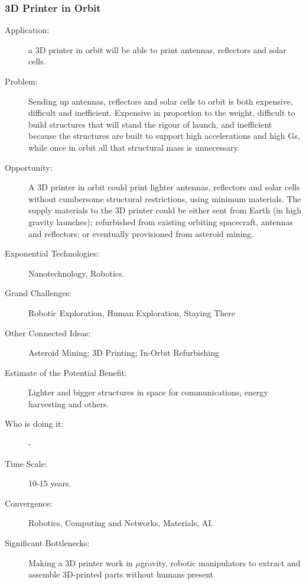    \subsubsection{3D Printer in Orbit}
  \label{3dprint}
 \begin{description}  \item[Application:] a \gls{3D printer} in orbit will be able to print antennas,
reflectors  and solar cells.
 
   \item[Problem:] Sending up antennas, reflectors and solar cells to orbit  is
both expensive, difficult and  inefficient. Expensive in proportion to
the  weight, difficult to build structures that will stand the rigour of
launch,  and inefficient because the structures are built to support high
accelerations  and high Gs, while once in orbit all that structural mass
is  unnecessary.
 
   \item[Opportunity:] A \gls{3D printer} in orbit could print lighter antennas,
reflectors  and solar cells without cumbersome structural restrictions,
using  minimum materials. The supply materials to the \gls{3D printer} could be
either  sent from Earth (in high gravity launches); refurbished from existing
orbiting  spacecraft, antennas and reflectors; or eventually provisioned
from  asteroid mining.
 
   \item[Exponential Technologies:] Nanotechnology, Robotics.
 
   \item[Grand Challenges:] Robotic Exploration, Human Exploration,  Staying There
 
  \item[Other Connected Ideas:]  Asteroid Mining; 3D Printing; In-Orbit
Refurbishing
 
  \item[Estimate of the Potential  Benefit:]Lighter and bigger structures in
space for communications, energy  harvesting and others.
 
   \item[Who is doing it:] -
 
   \item[Time Scale:] 10-15 years.
 
   \item[Convergence:] Robotics, Computing and Networks, Materials, AI.
 
   \item[Significant Bottlenecks:] Making a 3D printer work in  $\mu$gravity, robotic manipulators to extract and assemble 3D-printed  parts without humans present
     \end{description}
     

